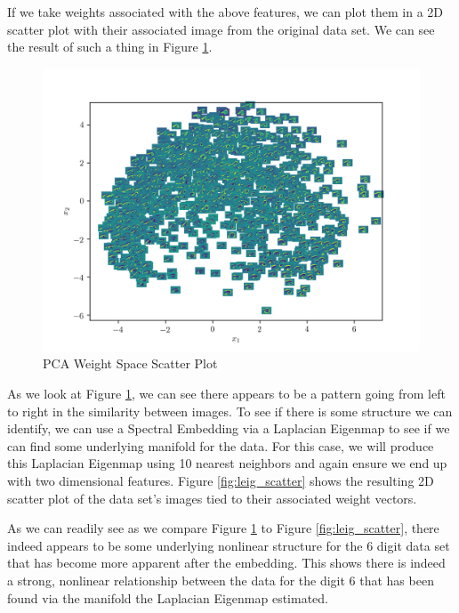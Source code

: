 \documentclass{article}[12pt]
\begin{document}
   If we take weights associated with the above features, we can plot them in a 2D scatter plot with their associated image from the original data set. We can see the result of such a thing in Figure \ref{fig:pca_scatter}.
   
   \begin{figure}[ht]
   \centerline{
   \includegraphics[scale=1.4]{p3/pca_weightspace_images_6.png}}
   \caption{PCA Weight Space Scatter Plot}
   \label{fig:pca_scatter}
   \end{figure}
   
   As we look at Figure \ref{fig:pca_scatter}, we can see there appears to be a pattern going from left to right in the similarity between images. To see if there is some structure we can identify, we can use a Spectral Embedding via a Laplacian Eigenmap to see if we can find some underlying manifold for the data. For this case, we will produce this Laplacian Eigenmap using 10 nearest neighbors and again ensure we end up with two dimensional features. Figure \ref{fig:leig_scatter} shows the resulting 2D scatter plot of the data set's images tied to their associated weight vectors. 
   
   As we can readily see as we compare Figure \ref{fig:pca_scatter} to Figure \ref{fig:leig_scatter}, there indeed appears to be some underlying nonlinear structure for the 6 digit data set that has become more apparent after the embedding. This shows there is indeed a strong, nonlinear relationship between the data for the digit 6 that has been found via the manifold the Laplacian Eigenmap estimated.
   
\end{document}
